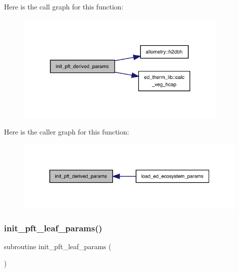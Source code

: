 Here is the call graph for this function\+:
\nopagebreak
\begin{figure}[H]
\begin{center}
\leavevmode
\includegraphics[width=290pt]{ed__params_8f90_a21ff8ff0bd1d75c0aa63e325b69234c4_cgraph}
\end{center}
\end{figure}
Here is the caller graph for this function\+:
\nopagebreak
\begin{figure}[H]
\begin{center}
\leavevmode
\includegraphics[width=325pt]{ed__params_8f90_a21ff8ff0bd1d75c0aa63e325b69234c4_icgraph}
\end{center}
\end{figure}
\mbox{\label{ed__params_8f90_a29b230a8d89c33fcad9397cb52370594}} 
\subsubsection{\texorpdfstring{init\+\_\+pft\+\_\+leaf\+\_\+params()}{init\_pft\_leaf\_params()}}
{\footnotesize\ttfamily subroutine init\+\_\+pft\+\_\+leaf\+\_\+params (\begin{DoxyParamCaption}{ }\end{DoxyParamCaption})}

